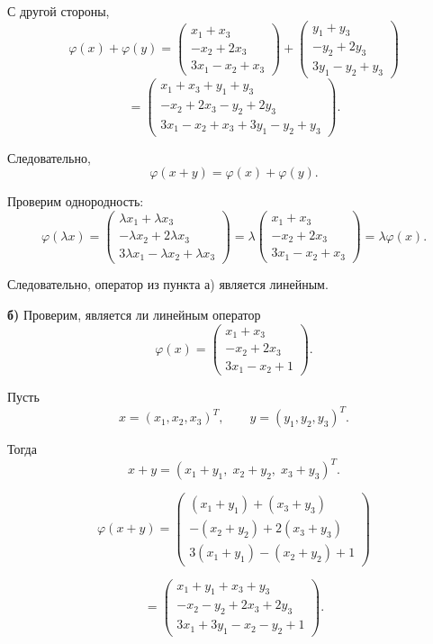 С другой стороны,
\[
\varphi(x)+\varphi(y)=
\begin{pmatrix}
x_1+x_3\\
-x_2+2x_3\\
3x_1-x_2+x_3
\end{pmatrix}
+
\begin{pmatrix}
y_1+y_3\\
-y_2+2y_3\\
3y_1-y_2+y_3
\end{pmatrix}
\]
\[
=
\begin{pmatrix}
x_1+x_3+y_1+y_3\\
-x_2+2x_3-y_2+2y_3\\
3x_1-x_2+x_3+3y_1-y_2+y_3
\end{pmatrix}.
\]

Следовательно,
\[
\varphi(x+y)=\varphi(x)+\varphi(y).
\]

Проверим однородность:
\[
\varphi(\lambda x)=
\begin{pmatrix}
\lambda x_1+\lambda x_3\\
-\lambda x_2+2\lambda x_3\\
3\lambda x_1-\lambda x_2+\lambda x_3
\end{pmatrix}
=
\lambda
\begin{pmatrix}
x_1+x_3\\
-x_2+2x_3\\
3x_1-x_2+x_3
\end{pmatrix}
=
\lambda \varphi(x).
\]

Следовательно, оператор из пункта а) является линейным.

\bigskip

\textbf{б)} Проверим, является ли линейным оператор
\[
\varphi(x)=
\begin{pmatrix}
x_1+x_3\\
-x_2+2x_3\\
3x_1-x_2+1
\end{pmatrix}.
\]

Пусть
\[
x=(x_1,x_2,x_3)^T,\qquad y=(y_1,y_2,y_3)^T.
\]

Тогда
\[
x+y=(x_1+y_1,\;x_2+y_2,\;x_3+y_3)^T.
\]

\[
\varphi(x+y)=
\begin{pmatrix}
(x_1+y_1)+(x_3+y_3)\\
-(x_2+y_2)+2(x_3+y_3)\\
3(x_1+y_1)-(x_2+y_2)+1
\end{pmatrix}
\]

\[
=
\begin{pmatrix}
x_1+y_1+x_3+y_3\\
-x_2-y_2+2x_3+2y_3\\
3x_1+3y_1-x_2-y_2+1
\end{pmatrix}.
\]

